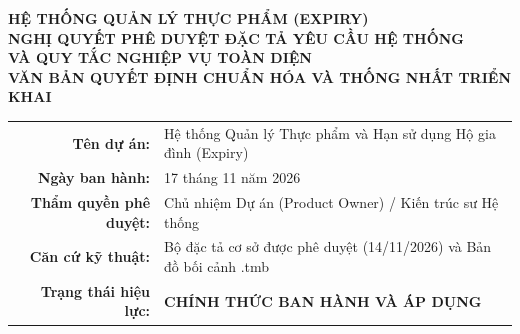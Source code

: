 \documentclass[10pt,a4paper]{article}
\begin{document}
\begin{titlepage}
\begin{center}
    \vspace*{0.8cm}
    {\color{primary}\Huge\bfseries HỆ THỐNG QUẢN LÝ THỰC PHẨM (EXPIRY)}\\[0.3cm]
    {\color{secondary}\LARGE\bfseries NGHỊ QUYẾT PHÊ DUYỆT ĐẶC TẢ YÊU CẦU HỆ THỐNG\\VÀ QUY TẮC NGHIỆP VỤ TOÀN DIỆN}\\[0.5cm]
    {\large\textbf{VĂN BẢN QUYẾT ĐỊNH CHUẨN HÓA VÀ THỐNG NHẤT TRIỂN KHAI}}\\[1.0cm]

    \begin{tabularx}{0.9\textwidth}{rX}
    \textbf{Tên dự án:} & Hệ thống Quản lý Thực phẩm và Hạn sử dụng Hộ gia đình (Expiry) \\
    \textbf{Ngày ban hành:} & 17 tháng 11 năm 2026 \\
    \textbf{Thẩm quyền phê duyệt:} & Chủ nhiệm Dự án (Product Owner) / Kiến trúc sư Hệ thống \\
    \textbf{Căn cứ kỹ thuật:} & Bộ đặc tả cơ sở được phê duyệt (14/11/2026) và Bản đồ bối cảnh .tmb \\
    \textbf{Trạng thái hiệu lực:} & \textbf{\color{primary}CHÍNH THỨC BAN HÀNH VÀ ÁP DỤNG} \\
    \end{tabularx}


\end{center}
\end{titlepage}
\end{document}
